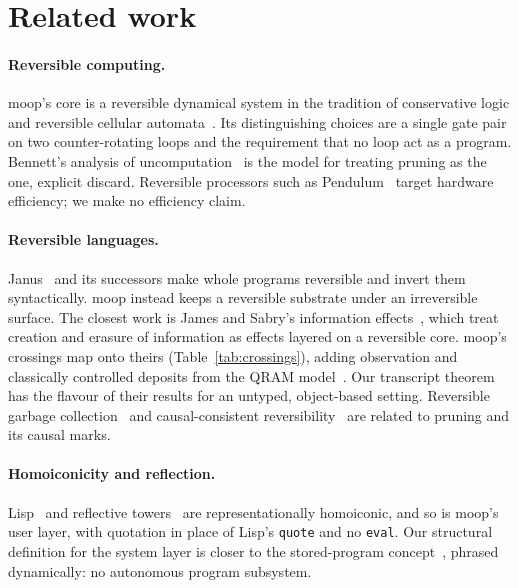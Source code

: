 \documentclass[11pt]{article}
\theoremstyle{definition}
\theoremstyle{remark}
\newcommand{\moop}{\textsf{moop}}
\newcommand{\code}[1]{\texttt{#1}}
\begin{document}
\section{Related work}
\label{sec:related}

\paragraph{Reversible computing.}
\moop{}'s core is a reversible dynamical system in the tradition of
conservative logic and reversible cellular
automata~\cite{fredkin1982,toffoli1987,morita2017}. Its distinguishing
choices are a single gate pair on two counter-rotating loops and the
requirement that no loop act as a program. Bennett's analysis of
uncomputation~\cite{bennett1973,bennett1989} is the model for treating
pruning as the one, explicit discard. Reversible processors such as
Pendulum~\cite{vieri1999} target hardware efficiency; we make no
efficiency claim.

\paragraph{Reversible languages.}
Janus~\cite{lutz1982,yokoyama2007} and its successors make whole
programs reversible and invert them syntactically. \moop{} instead keeps
a reversible substrate under an irreversible surface. The closest work is
James and Sabry's information effects~\cite{james2012}, which treat
creation and erasure of information as effects layered on a reversible
core. \moop{}'s crossings map onto theirs (Table~\ref{tab:crossings}),
adding observation and classically controlled deposits from the QRAM
model~\cite{knill1996}. Our transcript theorem has the flavour of their
results for an untyped, object-based setting. Reversible garbage
collection~\cite{mogensen2015} and causal-consistent
reversibility~\cite{danos2004} are related to pruning and its causal
marks.

\paragraph{Homoiconicity and reflection.}
Lisp~\cite{mccarthy1960} and reflective towers~\cite{smith1984} are
representationally homoiconic, and so is \moop{}'s user layer, with
quotation in place of Lisp's \code{quote} and no \code{eval}. Our
structural definition for the system layer is closer to the
stored-program concept~\cite{vonneumann1945}, phrased dynamically: no
autonomous program subsystem.
\end{document}
